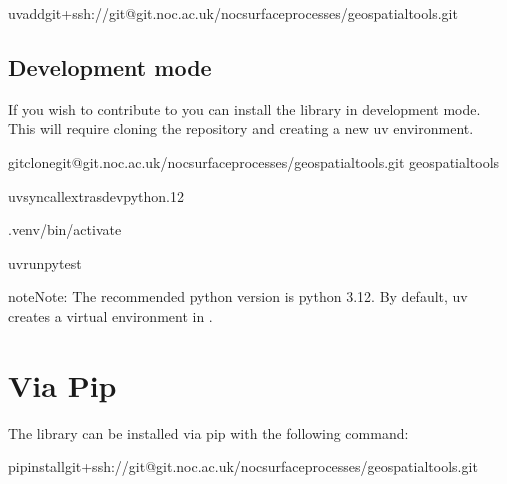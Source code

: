 \documentclass[letterpaper,10pt,english]{sphinxmanual}
\begin{document}
\begin{sphinxVerbatim}[commandchars=\\\{\}]
uvaddgit+ssh://git@git.noc.ac.uk/nocsurfaceprocesses/geospatialtools.git
\end{sphinxVerbatim}


\subsection{Development mode}
\label{\detokenize{installation:development-mode}}
\sphinxAtStartPar
If you wish to contribute to  you can install the library in development mode. This will require
cloning the repository and creating a new uv environment.

\begin{sphinxVerbatim}[commandchars=\\\{\}]
gitclonegit@git.noc.ac.uk/nocsurfaceprocesses/geospatialtools.git
geospatialtools

uvsync\PYGZhy{}\PYGZhy{}all\PYGZhy{}extras\PYGZhy{}\PYGZhy{}dev\PYGZhy{}\PYGZhy{}python.12

.venv/bin/activate

uvrunpytest
\end{sphinxVerbatim}

\begin{sphinxadmonition}{note}{Note:}
\sphinxAtStartPar
The recommended python version is python 3.12. By default, uv creates a virtual environment in .
\end{sphinxadmonition}


\section{Via Pip}
\label{\detokenize{installation:via-pip}}
\sphinxAtStartPar
The library can be installed via pip with the following command:

\begin{sphinxVerbatim}[commandchars=\\\{\}]
pipinstallgit+ssh://git@git.noc.ac.uk/nocsurfaceprocesses/geospatialtools.git
\end{sphinxVerbatim}
\end{document}
